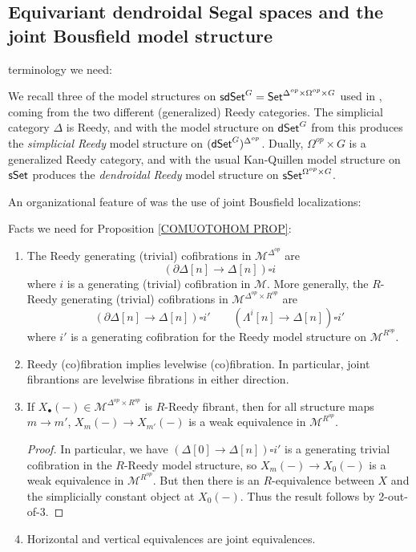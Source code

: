 \documentclass[a4paper,10pt
,draft
]{article}%
\renewcommand{\1}{\eta}%
\begin{document}
\subsection{Equivariant dendroidal Segal spaces and the joint Bousfield model structure}
\label{JT_SEC}

terminology we need:

We recall three of the model structures on $\mathsf{sdSet}^G = \mathsf{Set}^{\Delta^{op} \times \Omega^{op} \times G}$ used in \cite{BP_edss},
coming from the two different (generalized) Reedy categories.
The simplicial category $\Delta$ is Reedy, and with the model structure on $\mathsf{dSet}^G$ from \cite{Per_eds} this produces the
\textit{simplicial Reedy} model structure on  $(\mathsf{dSet}^G)^{\Delta^{op}}$.
Dually, $\Omega^{op} \times G$ is a generalized Reedy category, and with the usual Kan-Quillen model structure on $\mathsf{sSet}$ produces the
\textit{dendroidal Reedy} model structure on $\mathsf{sSet}^{\Omega^{op} \times G}$.

An organizational feature of \cite{BP_edss} was the use of joint Bousfield localizations:
\begin{definition}
      
\end{definition}



Facts we need for Proposition \ref{COMUOTOHOM PROP}:

\begin{enumerate}
\item The Reedy generating (trivial) cofibrations in $\mathcal M^{\Delta^{op}}$ are
      \[
            (\partial \Delta[n] \to \Delta[n]) \square i
      \]
      where $i$ is a generating (trivial) cofibration in $\mathcal M$.
      More generally, the $R$-Reedy generating (trivial) cofibrations in $\mathcal M^{\Delta^{op} \times R^{op}}$ are
      \[
            (\partial \Delta[n] \to \Delta[n]) \square i'
            \qquad
            (\Lambda^i[n] \to \Delta[n]) \square i'
      \]
      where $i'$ is a generating cofibration for the Reedy model structure on $\mathcal M^{R^{op}}$.
\item Reedy (co)fibration implies levelwise (co)fibration.
      In particular, joint fibrantions are levelwise fibrations in either direction.
\item If $X_\bullet(-) \in \mathcal M^{\Delta^{op} \times R^{op}}$ is $R$-Reedy fibrant, then for all structure maps $m \to m'$,
      $X_m(-) \to X_{m'}(-)$ is a weak equivalence in $\mathcal M^{R^{op}}$.
      \begin{proof}
            In particular, we have $(\Delta[0] \to \Delta[n]) \square i'$ is a generating trivial cofibration in the $R$-Reedy model structure, so $X_m(-) \to X_0(-)$ is a weak equivalence in $\mathcal M^{R^{op}}$.
            But then there is an $R$-equivalence between $X$ and the simplicially constant object at $X_0(-)$.
            Thus the result follows by 2-out-of-3.
      \end{proof}
\item Horizontal and vertical equivalences are joint equivalences.
\end{enumerate}
\end{document}
